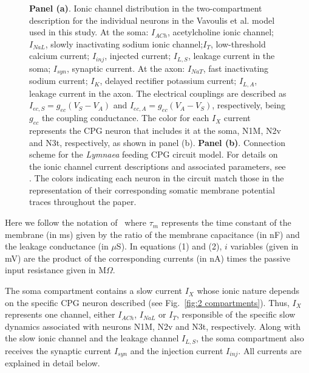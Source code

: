 \begin{figure}
 \caption{\textbf{Panel (a)}. Ionic channel distribution in the two-compartment description for the individual neurons in the Vavoulis et al. model \cite{Vavoulis2007} used in this study. At the soma: $I_{ACh}$, acetylcholine ionic channel; $I_{NaL}$, slowly inactivating sodium ionic channel;$I_T$, low-threshold calcium current; $I_{inj}$, injected current; $I_{L,S}$, leakage current in the soma; $I_{syn}$, synaptic current. At the axon: $I_{NaT}$, fast inactivating sodium current; $I_K$, delayed rectifier potassium current; $I_{L,A}$, leakage current in the axon. The electrical couplings are described as $I_{ec,S}=g_{ec}(V_S-V_A)$ and $I_{ec,A}=g_{ec}(V_A-V_S)$, respectively, being $g_{ec}$ the coupling conductance. The color for each $I_X$ current represents the CPG neuron that includes it at the soma,  N1M, N2v and N3t, respectively, as shown in panel (b). \textbf{Panel (b)}. Connection scheme for the {\sl Lymnaea} feeding CPG circuit model. For details on the ionic channel current descriptions and associated parameters, see \cite{Vavoulis2007}. The colors indicating each neuron in the circuit match those in the representation of their corresponding somatic membrane potential traces throughout the paper. 
}
    
\end{figure}


\vspace{0.3in}

\noindent Here we follow the notation of~\cite{Vavoulis2007} where $\tau_m$ represents the time constant of the membrane (in ms) given by the ratio of the membrane capacitance (in nF) and the leakage conductance (in $\mu$S).  In equations (1) and (2), $i$ variables (given in mV) are the product of the corresponding currents (in nA) times the passive input resistance given in M$\Omega$.


The soma compartment contains a slow current $I_X$ whose ionic nature depends on the specific CPG neuron described (see Fig.~\ref{fig:2 compartments}). Thus, $I_X$  represents one channel, either $I_{ACh}$, $I_{NaL}$ or $I_{T}$, responsible of the specific slow dynamics associated with neurons N1M, N2v and N3t, respectively.  Along with the slow ionic channel and the leakage channel  $I_{L,S}$, the soma compartment also receives the synaptic current $I_{syn}$ and the injection current $I_{inj}$. All currents are explained in detail below.


